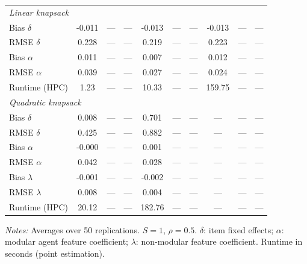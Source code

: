 \begin{table}[htbp]
\begin{threeparttable}
\begin{tabular}{l c c c c c c c c c}
\multicolumn{10}{l}{\textit{Linear knapsack}} \\[2pt]
Bias $\delta$ & -0.011 & --- & --- & -0.013 & --- & --- & -0.013 & --- & --- \\
RMSE $\delta$ & 0.228 & --- & --- & 0.219 & --- & --- & 0.223 & --- & --- \\
Bias $\alpha$ & 0.011 & --- & --- & 0.007 & --- & --- & 0.012 & --- & --- \\
RMSE $\alpha$ & 0.039 & --- & --- & 0.027 & --- & --- & 0.024 & --- & --- \\
Runtime (HPC) & 1.23 & --- & --- & 10.33 & --- & --- & 159.75 & --- & --- \\[4pt]
\multicolumn{10}{l}{\textit{Quadratic knapsack}} \\[2pt]
Bias $\delta$ & 0.008 & --- & --- & 0.701 & --- & --- & --- & --- & --- \\
RMSE $\delta$ & 0.425 & --- & --- & 0.882 & --- & --- & --- & --- & --- \\
Bias $\alpha$ & -0.000 & --- & --- & 0.001 & --- & --- & --- & --- & --- \\
RMSE $\alpha$ & 0.042 & --- & --- & 0.028 & --- & --- & --- & --- & --- \\
Bias $\lambda$ & -0.001 & --- & --- & -0.002 & --- & --- & --- & --- & --- \\
RMSE $\lambda$ & 0.008 & --- & --- & 0.004 & --- & --- & --- & --- & --- \\
Runtime (HPC) & 20.12 & --- & --- & 182.76 & --- & --- & --- & --- & --- \\[4pt]
\bottomrule
\end{tabular}
\begin{tablenotes}
\footnotesize
\item \textit{Notes:} Averages over 50 replications. $S = 1$, $\rho = 0.5$. $\delta$: item fixed effects; $\alpha$: modular agent feature coefficient; $\lambda$: non-modular feature coefficient. Runtime in seconds (point estimation).
\end{tablenotes}
\end{threeparttable}
\end{table}